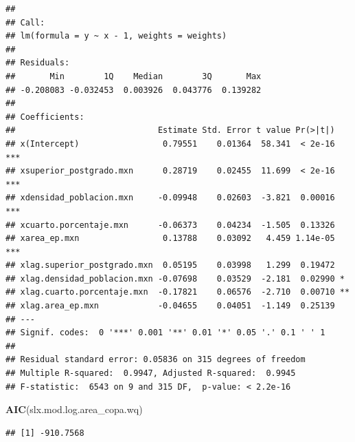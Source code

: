 \documentclass[12pt,]{book}
\newenvironment{Shaded}{\begin{snugshade}}{\end{snugshade}}
\newcommand{\KeywordTok}[1]{\textcolor[rgb]{0.13,0.29,0.53}{\textbf{#1}}}
\newcommand{\NormalTok}[1]{#1}
\begin{document}
\begin{verbatim}
## 
## Call:
## lm(formula = y ~ x - 1, weights = weights)
## 
## Residuals:
##       Min        1Q    Median        3Q       Max 
## -0.208083 -0.032453  0.003926  0.043776  0.139282 
## 
## Coefficients:
##                             Estimate Std. Error t value Pr(>|t|)    
## x(Intercept)                 0.79551    0.01364  58.341  < 2e-16 ***
## xsuperior_postgrado.mxn      0.28719    0.02455  11.699  < 2e-16 ***
## xdensidad_poblacion.mxn     -0.09948    0.02603  -3.821  0.00016 ***
## xcuarto.porcentaje.mxn      -0.06373    0.04234  -1.505  0.13326    
## xarea_ep.mxn                 0.13788    0.03092   4.459 1.14e-05 ***
## xlag.superior_postgrado.mxn  0.05195    0.03998   1.299  0.19472    
## xlag.densidad_poblacion.mxn -0.07698    0.03529  -2.181  0.02990 *  
## xlag.cuarto.porcentaje.mxn  -0.17821    0.06576  -2.710  0.00710 ** 
## xlag.area_ep.mxn            -0.04655    0.04051  -1.149  0.25139    
## ---
## Signif. codes:  0 '***' 0.001 '**' 0.01 '*' 0.05 '.' 0.1 ' ' 1
## 
## Residual standard error: 0.05836 on 315 degrees of freedom
## Multiple R-squared:  0.9947, Adjusted R-squared:  0.9945 
## F-statistic:  6543 on 9 and 315 DF,  p-value: < 2.2e-16
\end{verbatim}

\begin{Shaded}
\begin{Highlighting}[]
\KeywordTok{AIC}\NormalTok{(slx.mod.log.area_copa.wq)}
\end{Highlighting}
\end{Shaded}

\begin{verbatim}
## [1] -910.7568
\end{verbatim}
\end{document}
